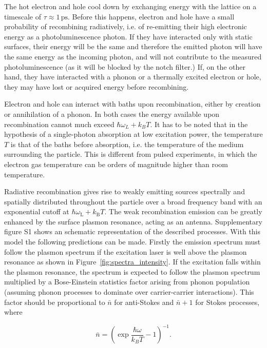 \documentclass[journal=nalefd,manuscript=letter]{achemso}
\newcommand{\ps}{\ensuremath{\,\textrm{ps}}}
\begin{document}
The hot electron and hole cool down by exchanging energy with the lattice on a
timescale of $\tau\approx1\ps$\cite{Pustovalov2005}. Before this happens,
electron and hole have a small probability of recombining radiatively, i.e. of 
re-emitting their high electronic energy as a photoluminescence photon. If they
have interacted only with static surfaces, their energy will be the same and
therefore the emitted photon will have the same energy as the incoming
photon, and will not contribute to the measured photoluminescence (as it will be
blocked by the notch filter.) If, on the other hand, they have interacted with a
phonon or a thermally excited electron or hole, they may have lost or acquired
energy before recombining.

Electron and hole can interact with baths upon recombination, either by
creation or annihilation of a phonon. In both cases the energy available upon
recombination cannot much exceed $\hbar\omega_L+k_BT$. It has to be noted that
in the hypothesis of a single-photon absorption at low excitation power, the
temperature $T$ is that of the baths before absorption, i.e. the temperature of
the medium surrounding the particle. This is different from pulsed experiments,
in which the electron gas temperature can be orders of magnitude higher than
room temperature\cite{Baffou2013a}. 

Radiative recombination gives rise to weakly emitting sources spectrally and
spatially distributed throughout the particle over a broad frequency band with
an exponential cutoff at $\hbar\omega_\textrm{L}+k_\textrm{B}T$. The weak
recombination emission can be greatly enhanced by the surface plasmon resonance,
acting as an antenna. Supplementary figure S1 shows an schematic representation
of the described processes. With this model the following predictions can be made.
Firstly the emission spectrum must follow the plasmon spectrum if the excitation
laser is well above the plasmon resonance as shown in \mbox{Figure
\ref{fig:spectra_intensity}}. If the excitation falls within the
plasmon resonance, the spectrum is expected to follow the plasmon spectrum
multiplied by a Bose-Einstein statistics factor arising from phonon population
(assuming phonon processes to dominate over carrier-carrier interactions).
This factor should be proportional to $\bar{n}$ for anti-Stokes and $\bar{n}+1$
for Stokes processes, where

\begin{equation}\label{eqn:BE}
	\bar{n}=\left(\exp\frac{\hbar\omega}{k_BT}-1\right)^{-1}.
\end{equation}
\end{document}
